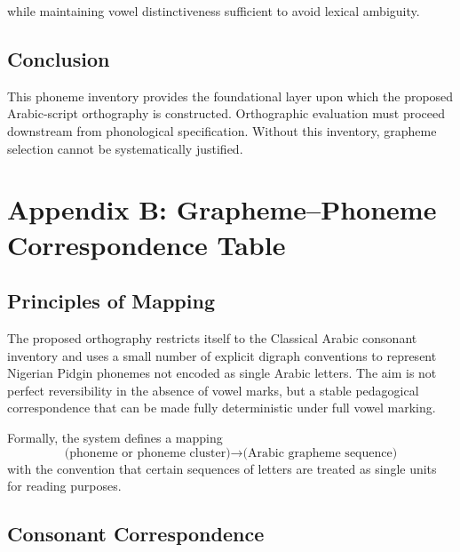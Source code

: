 \documentclass[12pt]{article}
\begin{document}
while maintaining vowel distinctiveness sufficient to avoid lexical ambiguity.

\subsection{Conclusion}

This phoneme inventory provides the foundational layer upon which the proposed Arabic-script orthography is constructed. Orthographic evaluation must proceed downstream from phonological specification. Without this inventory, grapheme selection cannot be systematically justified.

\section{Appendix B: Grapheme--Phoneme Correspondence Table}

\subsection{Principles of Mapping}

The proposed orthography restricts itself to the Classical Arabic consonant inventory and uses a small number of explicit digraph conventions to represent Nigerian Pidgin phonemes not encoded as single Arabic letters. The aim is not perfect reversibility in the absence of vowel marks, but a stable pedagogical correspondence that can be made fully deterministic under full vowel marking.

Formally, the system defines a mapping
\[
\text{(phoneme or phoneme cluster)} \longrightarrow \text{(Arabic grapheme sequence)}
\]
with the convention that certain sequences of letters are treated as single units for reading purposes.

\subsection{Consonant Correspondence}
\end{document}

